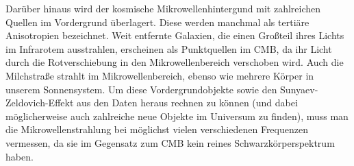 \documentclass[10pt,a4paper]{article}
\begin{document}
Darüber hinaus wird der kosmische Mikrowellenhintergund mit zahlreichen Quellen im Vordergrund überlagert. Diese werden manchmal als tertiäre Anisotropien bezeichnet.
Weit entfernte Galaxien, die einen Großteil ihres Lichts im Infrarotem ausstrahlen, erscheinen als Punktquellen im CMB, da ihr Licht durch die Rotverschiebung in den Mikrowellenbereich verschoben wird. Auch die Milchstraße strahlt im Mikrowellenbereich, ebenso wie mehrere Körper in unserem Sonnensystem.%
Um diese Vordergrundobjekte sowie den Sunyaev-Zeldovich-Effekt aus den Daten heraus rechnen zu können (und dabei möglicherweise auch zahlreiche neue Objekte im Universum zu finden), muss man die Mikrowellenstrahlung bei möglichst vielen verschiedenen Frequenzen vermessen, da sie im Gegensatz zum CMB kein reines Schwarzkörperspektrum haben.\cite{A+R}
\end{document}
